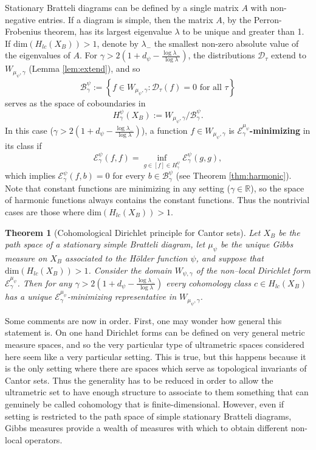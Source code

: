 \documentclass[12pt]{amsart}
\theoremstyle{plain}
\newtheorem{theorem}{Theorem}[section]
\theoremstyle{definition}
\begin{document}
Stationary Bratteli diagrams can be defined by a single matrix $A$ with non-negative entries. If a diagram is simple, then the matrix $A$, by the Perron-Frobenius theorem, has its largest eigenvalue $\lambda$ to be unique and greater than 1. If $\mathrm{dim}(H_{lc}(X_B))>1$, denote by $\lambda_-$ the smallest non-zero absolute value of the eigenvalues of $A$. For $\gamma>2(1+d_\psi - \frac{\log\lambda_-}{\log\lambda})$, the distributions $\mathcal{D}_\tau$ extend to $W_{\mu_\psi,\gamma}$ (Lemma \ref{lem:extend}), and so
$$\mathcal{B}^\psi_\gamma := \left\{ f\in W_{\mu_\psi,\gamma} : \mathcal{D}_\tau(f) = 0 \mbox{ for all }\tau \right\}$$
serves as the space of coboundaries in
$$H^\psi_\gamma(X_B):= W_{\mu_\psi,\gamma} /\mathcal{B}_\gamma^\psi .$$
In this case ($\gamma>2(1+d_\psi - \frac{\log\lambda_-}{\log\lambda})$), a function $f\in W_{\mu_\psi,\gamma} $ is \textbf{$\mathcal{E}_\gamma^{\mu_\psi}$-minimizing} in its class if 
$$\mathcal{E}_\gamma^\psi(f,f) = \inf_{g\in [f]\in H^\psi_\gamma}\mathcal{E}_\gamma^\psi(g,g),$$
which implies $\mathcal{E}_\gamma^\psi(f,b) = 0$ for every $b\in \mathcal{B}_\gamma^\psi$ (see Theorem \ref{thm:harmonic}). Note that constant functions are minimizing in any setting ($\gamma\in\mathbb{R}$), so the space of harmonic functions always contains the constant functions. Thus the nontrivial cases are those where $\mathrm{dim}(H_{lc}(X_B))>1$.
\begin{theorem}[Cohomological Dirichlet principle for Cantor sets]
\label{thm:hodge}
Let $X_B$ be the path space of a stationary simple Bratteli diagram, let $\mu_\psi$ be the unique Gibbs measure on $X_B$ associated to the H\"older function $\psi$, and suppose that $\mathrm{dim}(H_{lc}(X_B))>1$. Consider the domain $W_{\psi,\gamma}$ of the non–local Dirichlet form $\mathcal{E}_\gamma^{\mu_\psi}$. Then for any $\gamma>2(1+d_\psi - \frac{\log\lambda_-}{\log\lambda})$ every cohomology class $c\in H_{lc}(X_B)$ has a unique $\mathcal{E}_\gamma^{\mu_\psi}$-minimizing representative in $W_{\mu_\psi,\gamma}$.
\end{theorem}

Some comments are now in order. First, one may wonder how general this statement is. On one hand Dirichlet forms can be defined on very general metric measure spaces, and so the very particular type of ultrametric spaces considered here seem like a very particular setting. This is true, but this happens because it is the only setting where there are spaces which serve as topological invariants of Cantor sets. Thus the generality has to be reduced in order to allow the ultrametric set to have enough structure to associate to them something that can genuinely be called cohomology that is finite-dimensional. However, even if setting is restricted to the path space of simple stationary Bratteli diagrams, Gibbs measures provide a wealth of measures with which to obtain different non-local operators.
\end{document}
